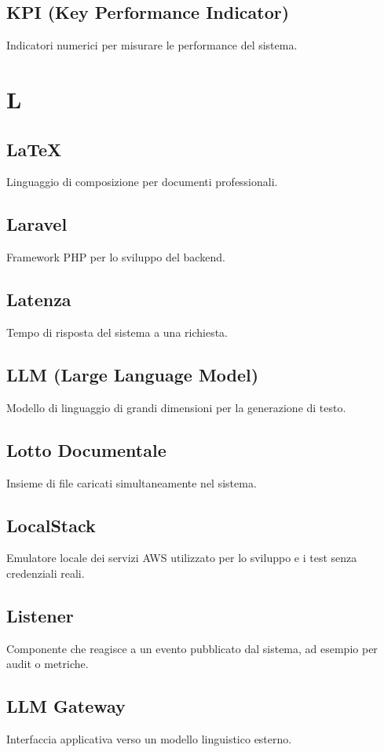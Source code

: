 \documentclass[a4paper,12pt]{article}
\begin{document}
\subsection{KPI (Key Performance Indicator)}
Indicatori numerici per misurare le performance del sistema.

\section{L}

\subsection{LaTeX}
Linguaggio di composizione per documenti professionali.

\subsection{Laravel}
Framework PHP per lo sviluppo del backend.

\subsection{Latenza}
Tempo di risposta del sistema a una richiesta.


\subsection{LLM (Large Language Model)}
Modello di linguaggio di grandi dimensioni per la generazione di testo.

\subsection{Lotto Documentale}
Insieme di file caricati simultaneamente nel sistema.

\subsection{LocalStack}
Emulatore locale dei servizi AWS utilizzato per lo sviluppo e i test senza credenziali reali.

\subsection{Listener}
Componente che reagisce a un evento pubblicato dal sistema, ad esempio per audit o metriche.

\subsection{LLM Gateway}
Interfaccia applicativa verso un modello linguistico esterno.
\end{document}
